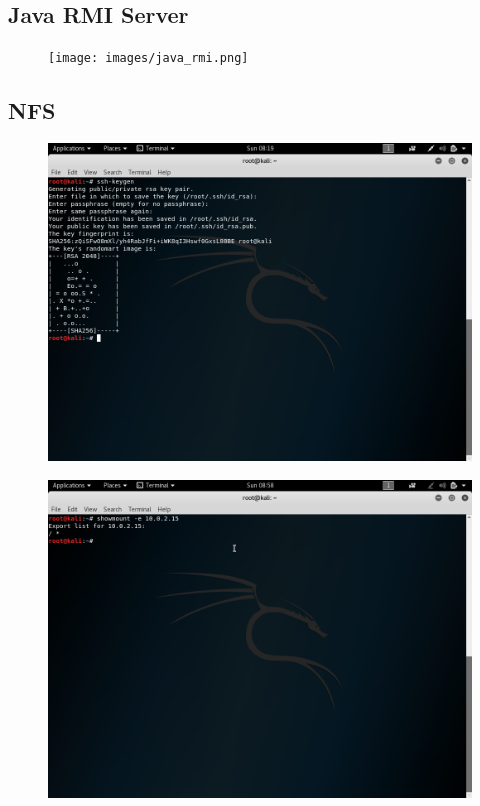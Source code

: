 \subsection{Java RMI Server}

\begin{figure}[H]
	\texttt{[image: images/java\_rmi.png]}
\end{figure}

\subsection{NFS}

\begin{figure}[H]
	\includegraphics[width=\textwidth]{images/nfs1.png}
\end{figure}

\begin{figure}[H]
	\includegraphics[width=\textwidth]{images/nfs2.png}
\end{figure}

